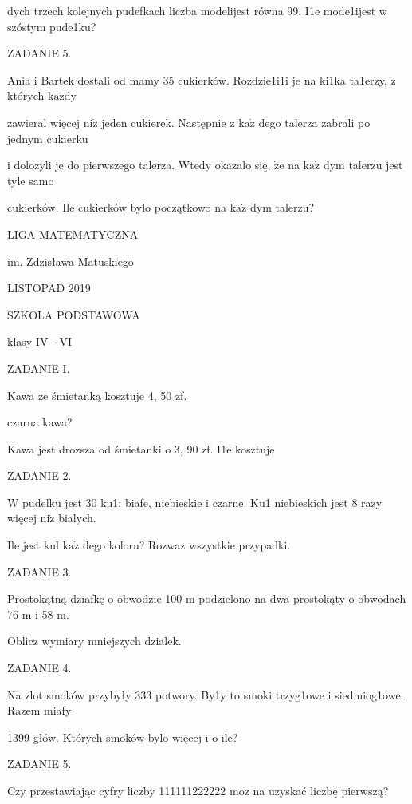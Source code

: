 \documentclass[a4paper,12pt]{article}
\begin{document}
dych trzech kolejnych pudefkach liczba modelijest równa 99. I1e mode1ijest w szóstym pude1ku?

ZADANIE 5.

Ania i Bartek dostali od mamy 35 cukierków. Rozdzie1i1i je na ki1ka ta1erzy, z których $\mathrm{k}\mathrm{a}\dot{\mathrm{z}}\mathrm{d}\mathrm{y}$

zawieral więcej $\mathrm{n}\mathrm{i}\dot{\mathrm{z}}$ jeden cukierek. Następnie z $\mathrm{k}\mathrm{a}\dot{\mathrm{z}}$ dego talerza zabrali po jednym cukierku

i dolozyli je do pierwszego talerza. Wtedy okazalo się, $\dot{\mathrm{z}}\mathrm{e}$ na $\mathrm{k}\mathrm{a}\dot{\mathrm{z}}$ dym talerzu jest tyle samo

cukierków. Ile cukierków bylo początkowo na $\mathrm{k}\mathrm{a}\dot{\mathrm{z}}$ dym talerzu?






LIGA MATEMATYCZNA

im. Zdzisława Matuskiego

LISTOPAD 2019

SZKOLA PODSTAWOWA

klasy IV - VI

ZADANIE I.

Kawa ze śmietanką kosztuje 4, 50 zf.

czarna kawa?

Kawa jest drozsza od śmietanki o 3, 90 zf. I1e kosztuje

ZADANIE 2.

$\mathrm{W}$ pudelku jest 30 ku1: biafe, niebieskie i czarne. Ku1 niebieskich jest 8 razy więcej $\mathrm{n}\mathrm{i}\dot{\mathrm{z}}$ bialych.

Ile jest kul $\mathrm{k}\mathrm{a}\dot{\mathrm{z}}$ dego koloru? Rozwaz wszystkie przypadki.

ZADANIE 3.

Prostokątną dziafkę o obwodzie 100 $\mathrm{m}$ podzielono na dwa prostokąty o obwodach 76 $\mathrm{m}$ i 58 $\mathrm{m}.$

Oblicz wymiary mniejszych dzialek.

ZADANIE 4.

Na zlot smoków przybyły 333 potwory. By1y to smoki trzyg1owe i siedmiog1owe. Razem miafy

1399 głów. Których smoków bylo więcej i o ile?

ZADANIE 5.

Czy przestawiając cyfry liczby 111111222222 $\mathrm{m}\mathrm{o}\dot{\mathrm{z}}$ na uzyskać liczbę pierwszą?
\end{document}
